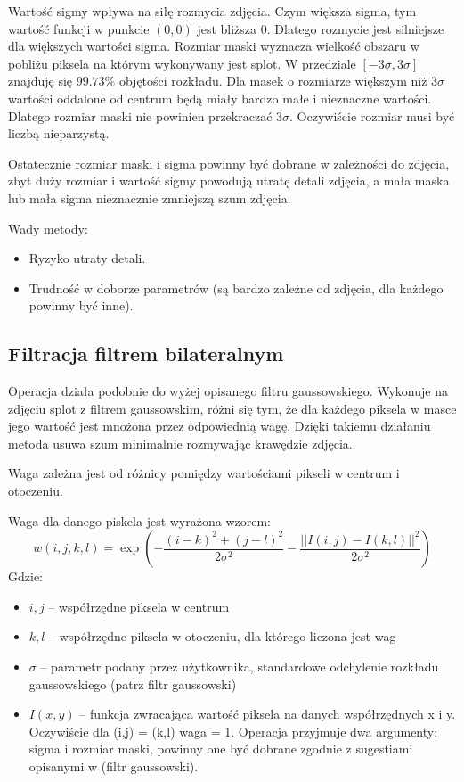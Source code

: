 \documentclass[]{mwart}
\begin{document}
Wartość sigmy wpływa na siłę rozmycia zdjęcia. Czym większa sigma, tym wartość funkcji w
punkcie $(0,0)$ jest bliższa $0$. Dlatego rozmycie jest silniejsze dla większych wartości sigma.
Rozmiar maski wyznacza wielkość obszaru w pobliżu piksela na którym wykonywany jest splot.
W przedziale $[-3 \sigma, 3\sigma]$ znajduję się $99.73\%$ objętości
rozkładu. Dla masek o rozmiarze większym niż $3\sigma$ wartości oddalone od centrum będą miały
bardzo małe i nieznaczne wartości. Dlatego rozmiar maski nie powinien przekraczać $3\sigma$.
Oczywiście rozmiar musi być liczbą nieparzystą. \newline

Ostatecznie rozmiar maski i sigma powinny być dobrane w zależności do zdjęcia, zbyt duży
rozmiar i wartość sigmy powodują utratę detali zdjęcia, a mała maska lub mała sigma nieznacznie
zmniejszą szum zdjęcia. \newline

Wady metody:
\begin{itemize}
    \item Ryzyko utraty detali.
    \item Trudność w doborze parametrów (są bardzo zależne od zdjęcia, dla każdego powinny być inne).
\end{itemize}

\subsection{Filtracja filtrem bilateralnym}
Operacja działa podobnie do wyżej opisanego filtru gaussowskiego. Wykonuje na zdjęciu splot z
filtrem gaussowskim, różni się tym, że dla każdego piksela w masce jego wartość jest mnożona
przez odpowiednią wagę. Dzięki takiemu działaniu metoda usuwa szum minimalnie rozmywając
krawędzie zdjęcia.

Waga zależna jest od różnicy pomiędzy wartościami pikseli w centrum i otoczeniu.

Waga dla danego piskela jest wyrażona wzorem:
\[w(i,j,k,l) = \exp \left(-\frac{(i-k)^2+(j-l)^2}{2\sigma^2}- \frac{||I(i,j) - I(k,l)||^2}{2\sigma^2}\right)\]
Gdzie:
\begin{itemize}
    \item $i,j$ -- współrzędne piksela w centrum
    \item $k,l$ -- współrzędne piksela w otoczeniu, dla którego liczona jest wag
    \item $\sigma$ -- parametr podany przez użytkownika, standardowe odchylenie rozkładu gaussowskiego (patrz filtr gaussowski)
    \item $I(x,y)$ -- funkcja zwracająca wartość piksela na danych współrzędnych x i y. Oczywiście dla (i,j) = (k,l) waga = 1. Operacja przyjmuje dwa argumenty: sigma i rozmiar maski, powinny one być dobrane zgodnie z sugestiami opisanymi w (filtr gaussowski).
\end{itemize}
\newpage
\end{document}
